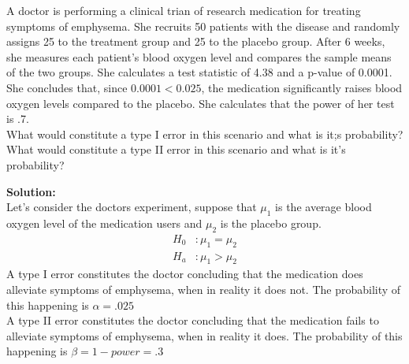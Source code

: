 \documentclass[12pt]{article}
\makeatletter
\theoremstyle{homework}
\newenvironment{exercise}[1]
{\def\@currentlabel{#1}\exercisecore}
{\endexercisecore}
\newcommand{\localhead}[1]{\par\smallskip\noindent\textbf{#1}\nobreak\\}%
\newcommand\solution{\localhead{Solution:}}
\makeatother
\begin{document}
\begin{exercise}{12} A doctor is performing a clinical trian of research medication
    for treating symptoms of emphysema. She recruits 50 patients with the disease and randomly 
    assigns 25 to the treatment group and 25 to the placebo group. After 6 weeks, she measures 
    each patient's blood oxygen level and compares the sample means of the two groups. She calculates 
    a test statistic of 4.38 and a p-value of 0.0001. She concludes that, since $0.0001<0.025$, the 
    medication significantly raises blood oxygen levels compared to the placebo. She calculates that the 
    power of her test is .7.\\

    What would constitute a type I error in this scenario and what is it;s probability? What would 
    constitute a type II error in this scenario and what is it's probability?

    \solution Let's consider the doctors experiment, suppose that $\mu_1$ is the average blood oxygen 
    level of the medication users and $\mu_2$ is the placebo group. 
    \begin{align*}
        H_0&: \mu_1 = \mu_2\\
        H_a&: \mu_1 > \mu_2
    \end{align*}
    A type I error constitutes the doctor concluding that the medication does alleviate symptoms
    of emphysema, when in reality it does not. The probability of this happening is $\alpha = .025$\\

    A type II error constitutes the doctor concluding that the medication fails to alleviate symptoms of 
    emphysema, when in reality it does. The probability of this happening is $\beta = 1-power = .3$

\end{exercise}
\end{document}
